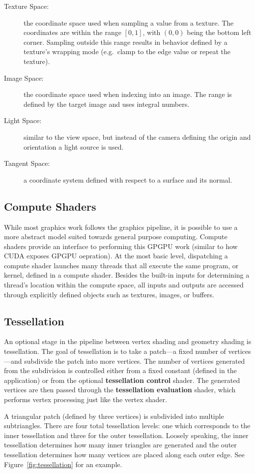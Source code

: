 \begin{description}
    \item[Texture Space:] the coordinate space used when sampling a value from a texture. The coordinates are within the range $[0, 1]$, with $(0, 0)$ being the bottom left corner. Sampling outside this range results in behavior defined by a texture's wrapping mode (e.g.\ clamp to the edge value or repeat the texture).
    \item[Image Space:] the coordinate space used when indexing into an image. The range is defined by the target image and uses integral numbers.
    \item[Light Space:] similar to the view space, but instead of the camera defining the origin and orientation a light source is used.
    \item[Tangent Space:] a coordinate system defined with respect to a surface and its normal.
\end{description}

\subsection{Compute Shaders}
While most graphics work follows the graphics pipeline, it is possible to use a more abstract model suited towards general purpose computing. Compute shaders provide an interface to performing this GPGPU work (similar to how CUDA exposes GPGPU oepration). At the most basic level, dispatching a compute shader launches many threads that all execute the same program, or kernel, defined in a compute shader. Besides the built-in inputs for determining a thread's location within the compute space, all inputs and outputs are accessed through explicitly defined objects such as textures, images, or buffers.

\subsection{Tessellation}
An optional stage in the pipeline between vertex shading and geometry shading is tessellation. The goal of tessellation is to take a patch---a fixed number of vertices---and subdivide the patch into more vertices. The number of vertices generated from the subdivision is controlled either from a fixed constant (defined in the application) or from the optional \textbf{tessellation control} shader. The generated vertices are then passed through the \textbf{tessellation evaluation} shader, which performs vertex processing just like the vertex shader.

A triangular patch (defined by three vertices) is subdivided into multiple subtriangles. There are four total tessellation levels: one which corresponds to the inner tessellation and three for the outer tessellation. Loosely speaking, the inner tessellation determines how many inner triangles are generated and the outer tessellation determines how many vertices are placed along each outer edge. See Figure~\ref{fig:tessellation} for an example.

